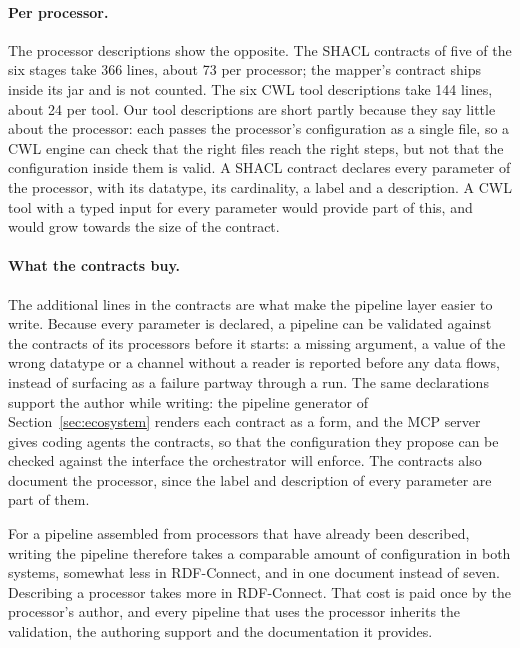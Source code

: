 \paragraph{Per processor.} The processor descriptions show the opposite. The
SHACL contracts of five of the six stages take 366 lines, about 73 per
processor; the mapper's contract ships inside its jar and is not counted. The
six CWL tool descriptions take 144 lines, about 24 per tool. Our tool
descriptions are short partly because they say little about the processor: each
passes the processor's configuration as a single file, so a CWL engine can check
that the right files reach the right steps, but not that the configuration
inside them is valid. A SHACL contract declares every parameter of the
processor, with its datatype, its cardinality, a label and a description. A CWL
tool with a typed input for every parameter would provide part of this, and
would grow towards the size of the contract.

\paragraph{What the contracts buy.} The additional lines in the contracts are
what make the pipeline layer easier to write. Because every parameter is
declared, a pipeline can be validated against the contracts of its processors
before it starts: a missing argument, a value of the wrong datatype or a
channel without a reader is reported before any data flows, instead of
surfacing as a failure partway through a run. The same declarations support the
author while writing: the pipeline generator of Section~\ref{sec:ecosystem}
renders each contract as a form, and the MCP server gives coding agents the
contracts, so that the configuration they propose can be checked against the
interface the orchestrator will enforce. The contracts also document the
processor, since the label and description of every parameter are part of them.

For a pipeline assembled from processors that have already been described,
writing the pipeline therefore takes a comparable amount of configuration in
both systems, somewhat less in RDF-Connect, and in one document instead of
seven. Describing a processor takes more in RDF-Connect. That cost is paid once
by the processor's author, and every pipeline that uses the processor inherits
the validation, the authoring support and the documentation it provides.

